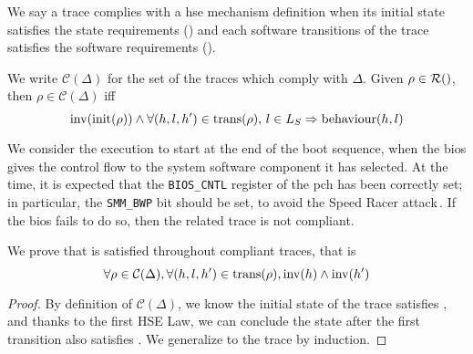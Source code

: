 We say a trace complies with a \ac{hse} mechanism definition when its initial
state satisfies the state requirements () and each software
transitions of the trace satisfies the software requirements ().
%
\begin{definition}
  We write $\mathcal{C}(\Delta)$ for the set of the traces which comply with
  $\Delta$.
  Given $\rho \in \pathesLTS{Ez}$, then $\rho \in \mathcal{C}(\Delta)$ iff
  \[
    \mathrm{inv}(\mathrm{init}(\rho)) \wedge \forall (h,l,h') \in
    \mathrm{trans}(\rho)\text{, }l \in L_S \Rightarrow \mathrm{behaviour}(h, l)
  \]
\end{definition}

\begin{example}
  We consider the execution to start at the end of the boot sequence, when the
  \ac{bios} gives the control flow to the system software component it has
  selected.
  At the time, it is expected that the \texttt{BIOS\_CNTL} register of the
  \ac{pch} has been correctly set; in particular, the \texttt{SMM\_BWP} bit
  should be set, to avoid the Speed Racer
  attack\,\cite{kallenberg2015racecondition}.
  If the \ac{bios} fails to do so, then the related trace is not compliant.
\end{example}

\begin{lemma}
  \label{lemma:speccert:hseinv}
  We prove that  is satisfied throughout compliant traces, that is
  \[
    \forall \rho \in \mathcal{C}(\Delta), \forall (h, l, h') \in
    \mathrm{trans}(\rho), \mathrm{inv}(h) \wedge \mathrm{inv}(h')
  \]

  \begin{proof}
    By definition of $\mathcal{C}(\Delta)$, we know the initial state of the
    trace satisfies , and thanks to the first HSE Law, we can conclude
    the state after the first transition also satisfies .
    We generalize to the trace by induction.
  \end{proof}
\end{lemma}

